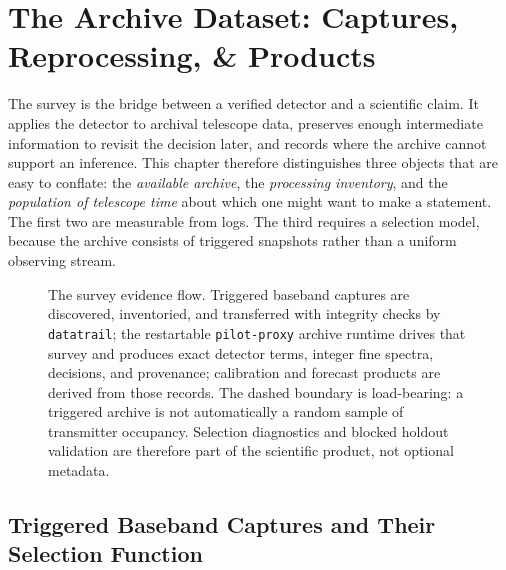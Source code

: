 \chapter{The Archive Dataset: Captures, Reprocessing, \& Products}
\label{sec:survey}

The survey is the bridge between a verified detector and a scientific claim.
It applies the detector to archival telescope data, preserves enough intermediate
information to revisit the decision later, and records where the archive cannot
support an inference.  This chapter therefore distinguishes three objects that
are easy to conflate: the \emph{available archive}, the \emph{processing
inventory}, and the \emph{population of telescope time} about which one might
want to make a statement.  The first two are measurable from logs.  The third
requires a selection model, because the archive consists of triggered snapshots
rather than a uniform observing stream.

\begin{figure}[t]
\centering
\resizebox{\linewidth}{!}{}
\caption[Survey evidence flow and claim boundary]{The survey evidence flow.
Triggered baseband captures are discovered, inventoried, and transferred
with integrity checks by \texttt{datatrail}; the restartable
\texttt{pilot-proxy} archive runtime drives that survey and produces exact
detector terms, integer fine spectra, decisions, and provenance; calibration
and forecast products are derived from those records.  The dashed boundary is
load-bearing: a triggered archive is not automatically a random sample of
transmitter occupancy.  Selection diagnostics and blocked holdout validation are
therefore part of the scientific product, not optional metadata.}
\label{fig:survey:evidenceflow}
\end{figure}

\section{Triggered Baseband Captures and Their Selection Function}
\label{sec:survey:data}

